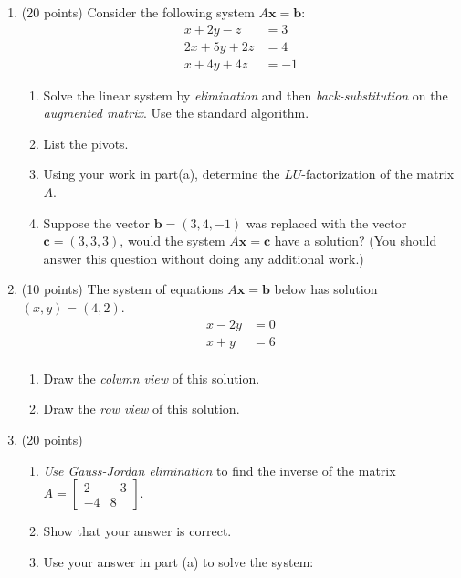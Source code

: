 \documentclass[11pt]{amsart}
\newcommand{\bb}{\mathbf{b}}
\newcommand{\bc}{\mathbf{c}}
\newcommand{\bx}{\mathbf{x}}
\begin{document}
\begin{enumerate}
\item (20 points) Consider the following system $A\bx = \bb$:  
\begin{align*}
x + 2y - z &= 3\\
2x + 5y + 2z &= 4\\
x + 4y + 4z &= -1
\end{align*}

	\begin{enumerate}
	\item Solve the linear system by \emph{elimination} and then \emph{back-substitution} on the \emph{augmented matrix}.  Use the standard algorithm.  
	\vfill
	\item List the pivots.
	\vspace{0.5in}
	\item Using your work in part(a), determine the $LU$-factorization of the matrix $A.$
	\vspace{1in}
	\item Suppose the vector $\bb=(3,4,-1)$ was replaced with the vector $\bc=(3,3,3)$, would the system $A \bx =\bc$ have a solution? (You should answer this question without doing any additional work.)
	\vspace{1in}
	\end{enumerate}
\newpage
\item (10 points) The system of equations $A\bx = \bb$ below has solution $(x,y)=(4,2).$
\begin{align*}
x - 2y  &= 0\\
x + y  &= 6\\
\end{align*}
	\begin{enumerate}
	\item Draw the \emph{column view} of this solution.
	\vfill
	\item Draw the \emph{row view} of this solution.
	\vfill
	\end{enumerate}
	
\newpage

\item (20 points) 
	\begin{enumerate}
	\item \emph{Use Gauss-Jordan elimination} to find the inverse of the matrix $A=\begin{bmatrix} 2&-3\\-4& 8 \end{bmatrix}$. 
	\vfill
	\item Show that your answer is correct.
	\vspace{1.5in}
	\item Use your answer in part (a) to solve the system:
	

\end{enumerate}
\end{enumerate}
\end{document}
